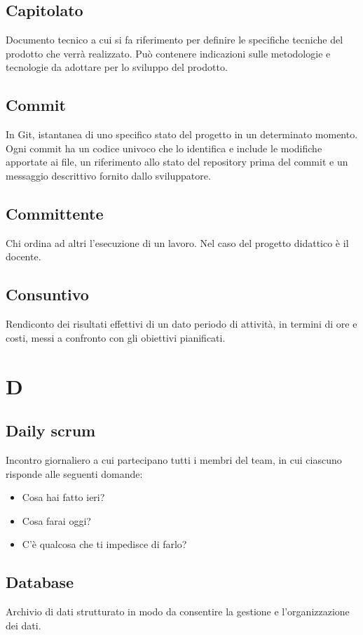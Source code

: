     \subsection{Capitolato}
    Documento tecnico a cui si fa riferimento per definire le specifiche tecniche 
    del prodotto che verrà realizzato. Può contenere indicazioni sulle metodologie e
    tecnologie da adottare per lo sviluppo del prodotto.
    \subsection{Commit}
    In Git, istantanea di uno specifico stato del progetto in un determinato momento.
    Ogni commit ha un codice univoco che lo identifica e include le modifiche apportate ai file,
    un riferimento allo stato del repository prima del commit e un messaggio descrittivo fornito dallo sviluppatore.
    \subsection{Committente}
    Chi ordina ad altri l'esecuzione di un lavoro. Nel caso del progetto didattico
    è il docente.
    \subsection{Consuntivo}
    Rendiconto dei risultati effettivi di un dato periodo di attività, 
    in termini di ore e costi, messi a confronto con gli obiettivi pianificati.
\pagebreak
\section{D}
    \subsection{Daily scrum}
    Incontro giornaliero a cui partecipano tutti i membri del team, in cui ciascuno
    risponde alle seguenti domande:
    \begin{itemize}
        \item Cosa hai fatto ieri?
        \item Cosa farai oggi?
        \item C'è qualcosa che ti impedisce di farlo?
    \end{itemize}
    \subsection{Database}
    Archivio di dati strutturato in modo da consentire la gestione e 
    l'organizzazione dei dati.
